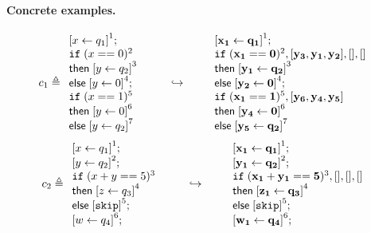\documentclass[a4paper,11pt]{article}
\begin{document}
\paragraph{Concrete examples.}
\[
c_1 \triangleq
\begin{array}{l}
     \left[x \leftarrow q_1 \right]^1; \\
     \eif \; (x ==0)^{2} \; \\
    \mathsf{then} \; \left[y \leftarrow q_2 \right]^3\; \\
    \mathsf{else} \; \left[y \leftarrow 0 \right]^4 ; \\
    \eif \; (x == 1 )^5\; \\
    \mathsf{then} \; \left[ y \leftarrow 0 \right]^6\; \\
    \mathsf{else} \; \left[y \leftarrow q_2 \right]^7\\
\end{array}
%
%
\hspace{20pt} \hookrightarrow  \hspace{20pt}
%
\begin{array}{l}
     \left[ \ssa{x_1} \leftarrow \ssa{q_1} \right]^1; \\
     \eif \; (\ssa{x_1 ==0})^{2}, [\ssa{ y_3, y_1,y_2  }],[],[]  \; \\
    \mathsf{then} \; \left[ \ssa{y_1 \leftarrow q_2} \right]^3\; \\
    \mathsf{else} \; \left[\ssa{y_2 \leftarrow 0 } \right]^4 ; \\
    \eif \; (\ssa{x_1 == 1} )^{5} , [\ssa{ y_6, y_4, y_5 } ] \; \\
    \mathsf{then} \; \left[ \ssa{y_4 \leftarrow 0} \right]^6\; \\
    \mathsf{else} \; \left[\ssa{y_5 \leftarrow q_2 } \right]^7\\
\end{array}
\]
\[
c_2 \triangleq
\begin{array}{l}
   \left[ x \leftarrow q_1 \right]^1; \\
   \left[y \leftarrow q_2\right]^2 ; \\
    \eif \;( x + y == 5 )^3\; \\
    \mathsf{then} \;\left[ z \leftarrow q_3\right]^4 \; \\
    \mathsf{else} \;\left[ \ssa{\eskip}\right]^5 ; \\
   \left[ w \leftarrow q_4 \right]^6; \\
\end{array}
\hspace{20pt} \hookrightarrow \hspace{20pt}
%
\begin{array}{l}
   \left[ \ssa{ x_1 \leftarrow q_1} \right]^1; \\
   \left[\ssa{ y_1 \leftarrow q_2} \right]^2 ; \\
    \eif \;( \ssa{ x_1 + y_1 == 5} )^3, [ ],[] ,[ ]\; \\
    \mathsf{then} \;\left[ \ssa{ z_1 \leftarrow q_3}\right]^4 \; \\
    \mathsf{else} \;\left[ \eskip\right]^5 ; \\
   \left[ \ssa{ w_1 \leftarrow q_4 }\right]^6; \\
\end{array}
\]
\end{document}
